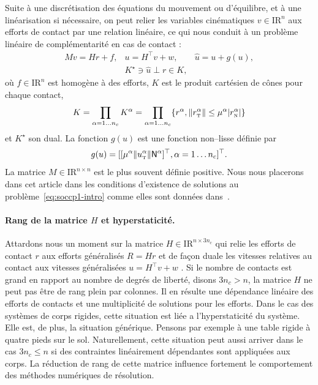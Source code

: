 \documentclass{CSMA2017}
\def\RR{\nbR}
\def\nbR{\ensuremath{\mathrm{I\!R}}} %
\def\n{{\hbox{\tiny{N}}}}
\def\t{{\hbox{\tiny{T}}}}
\begin{document}
Suite à une discrétisation des équations du mouvement ou d'équilibre, et à une linéarisation si nécessaire, on peut relier les variables cinématiques $ {v} \in \RR^n$ aux efforts de contact par une relation linéaire, ce qui nous conduit à un  problème linéaire de complémentarité en cas de contact :
\begin{equation}\label{eq:soccp1-intro}
  \begin{array}{rcl}
    M v = {H} {r} + {f}, &
    u = H^\top v + w,  &
    \hat u = u + g(u) ,\\[1mm]
    &    K^\star \ni {\hat u} \perp r \in K,&
  \end{array}
\end{equation}
où $f\in \RR^n$ est homogène à des efforts, $K$ est le produit cartésien de cônes pour chaque contact, 
\begin{equation}
  \label{eq:CC}
  K = \prod_{\alpha=1\ldots n_c} K^{\alpha}  = \prod_{\alpha=1\ldots n_c} \{r^\alpha, \|r^\alpha_\t \| \leq \mu^\alpha |r^\alpha_\n| \}
\end{equation}
et $K^\star$ son dual. La fonction $g(u)$ est une fonction non--lisse définie par 
\begin{equation}
g(u) = [[\mu^\alpha  \|u^\alpha_\t\| {\sf N}^\alpha]^\top, \alpha = 1\ldots n_c]^\top\label{eq:gg}. 
\end{equation}
La matrice $M \in \RR^{n \times n}$ est le plus souvent définie positive. Nous nous placerons dans cet article dans les conditions d'existence de solutions au problème~\eqref{eq:soccp1-intro} comme elles sont données dans~\cite{Klarbring.Pang1998,Acary.ea_ZAMM2011}.


\paragraph{Rang de la matrice $H$ et hyperstaticité.} 
Attardons nous un moment sur la matrice $H \in \RR^{n\times 3n_c} $ qui relie les efforts de contact $r$ aux efforts généralisés $R=H r$ et de façon duale les vitesses relatives au contact aux vitesses généralisées $u = H^\top v +w$ . Si le nombre de contacts est grand en rapport au nombre de degrés de liberté, disons $3 n_c > n$, la matrice $H$ ne peut pas être de rang plein par colonnes. Il en résulte une dépendance linéaire des efforts de contacts et une multiplicité de solutions pour les efforts. Dans le cas des systèmes de corps rigides, cette situation est liée a l'hyperstaticité du système. Elle est, de plus, la situation générique. Pensons par exemple à une table rigide à quatre pieds sur le sol. Naturellement, cette situation peut aussi arriver dans le cas $3 n_c \leq  n$ si des contraintes linéairement dépendantes sont appliquées aux corps. La réduction de rang de cette matrice influence fortement le comportement des méthodes numériques de résolution. 
\end{document}
